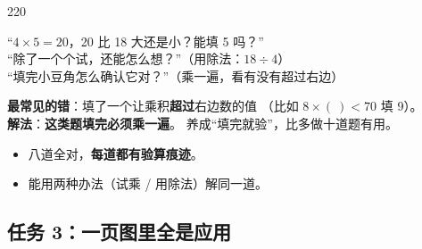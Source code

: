 \begin{lesson}{2}{20}
\begin{saybox}
“$4\times5=20$，20 比 18 大还是小？能填 5 吗？”\\
“除了一个个试，还能怎么想？”（用除法：$18\div4$）\\
“填完小豆角怎么确认它对？”（乘一遍，看有没有超过右边）
\end{saybox}

\begin{pitbox}
\textbf{最常见的错}：填了一个让乘积\textbf{超过}右边数的值
（比如 $8\times(\ )<70$ 填 9）。\\
\textbf{解法}：\textbf{这类题填完必须乘一遍}。
养成“填完就验”，比多做十道题有用。
\end{pitbox}

\begin{passbox}
\begin{itemize}
  \item 八道全对，\textbf{每道都有验算痕迹}。
  \item 能用两种办法（试乘 / 用除法）解同一道。
\end{itemize}
\end{passbox}
\end{lesson}

\subsection{任务 3：一页图里全是应用}

